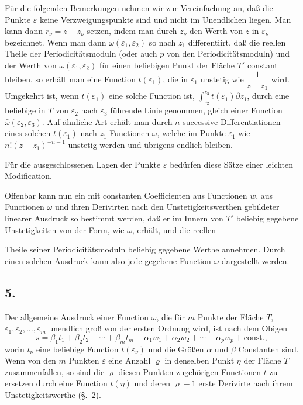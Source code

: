 \documentclass{article}
\begin{document}
Für die folgenden Bemerkungen nehmen wir zur Vereinfachung an, daß die Punkte $\varepsilon$ keine Verzweigungspunkte sind und nicht im Unendlichen liegen. Man kann dann $r_{\nu} = z - z_{\nu}$ setzen, indem man durch $z_{\nu}$ den Werth von $z$ in $\varepsilon_{\nu}$ bezeichnet. Wenn man dann $\bar{\omega}(\varepsilon_{1}, \varepsilon_{2})$ so nach $z_{1}$ differentiirt, daß die reellen Theile der Periodicitätsmoduln (oder auch $p$ von den Periodicitätsmoduln) und der Werth von $\bar{\omega}(\varepsilon_{1}, \varepsilon_{2})$ für einen beliebigen Punkt der Fläche $T'$ constant bleiben, so erhält man eine Function $t(\varepsilon_{1})$, die in $\varepsilon_{1}$ unstetig wie $\dfrac{1}{z - z_{1}}$ wird. Umgekehrt ist, wenn $t(\varepsilon_{1})$ eine solche Function ist, $\displaystyle\int_{z_{2}}^{z_{3}} t(\varepsilon_{1}) \partial z_{1}$, durch eine beliebige in $T$ von $\varepsilon_{2}$ nach $\varepsilon_{3}$ führende Linie genommen, gleich einer Function $\bar{\omega}(\varepsilon_{2}, \varepsilon_{3})$. Auf ähnliche Art erhält man durch $n$ successive Differentiationen eines solchen $t(\varepsilon_{1})$ nach $z_{1}$ Functionen $\omega$, welche im Punkte $\varepsilon_{1}$ wie $n!(z - z_{1})^{-n-1}$ unstetig werden und übrigens endlich bleiben.

Für die ausgeschlossenen Lagen der Punkte $\varepsilon$ bedürfen diese Sätze einer leichten Modification.

Offenbar kann nun ein mit constanten Coefficienten aus Functionen $w$, aus Functionen $\bar{\omega}$ und ihren Derivirten nach den Unstetigkeitswerthen gebildeter linearer Ausdruck so bestimmt werden, daß er im Innern von $T'$ beliebig gegebene Unstetigkeiten von der Form, wie $\omega$, erhält, und die reellen

Theile seiner Periodicitätsmoduln beliebig gegebene Werthe annehmen. Durch einen solchen Ausdruck kann also jede gegebene Function $\omega$ dargestellt werden.

\subsection*{5.}

Der allgemeine Ausdruck einer Function $\omega$, die für $m$ Punkte der Fläche $T$, $\varepsilon_{1}, \varepsilon_{2}, \ldots, \varepsilon_{m}$ unendlich groß von der ersten Ordnung wird, ist nach dem Obigen
\[ s = \beta_{1} t_{1} + \beta_{2} t_{2} + \cdots + \beta_{m} t_{m} + \alpha_{1} w_{1} + \alpha_{2} w_{2} + \cdots + \alpha_{p} w_{p} + \text{const.}, \]
worin $t_{\nu}$ eine beliebige Function $t(\varepsilon_{\nu})$ und die Größen $\alpha$ und $\beta$ Constanten sind. Wenn von den $m$ Punkten $\varepsilon$ eine Anzahl $\varrho$ in denselben Punkt $\eta$ der Fläche $T$ zusammenfallen, so sind die $\varrho$ diesen Punkten zugehörigen Functionen $t$ zu ersetzen durch eine Function $t(\eta)$ und deren $\varrho - 1$ erste Derivirte nach ihrem Unstetigkeitswerthe (§.~2).
\end{document}
